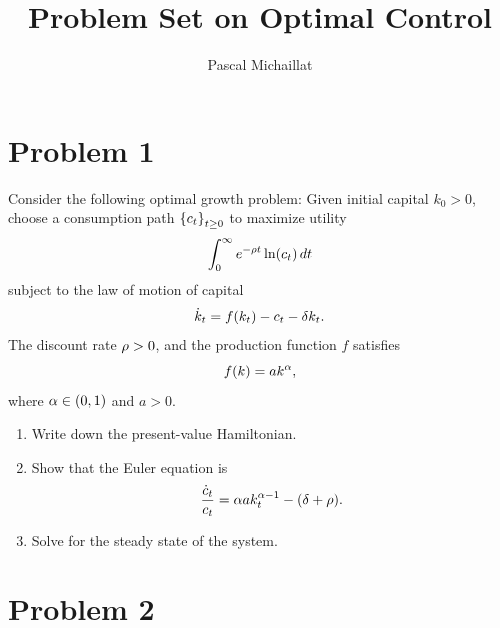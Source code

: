 \documentclass[letterpaper, 11pt, leqno]{article}
\begin{document}
\title{Problem Set on Optimal Control}
\author{Pascal Michaillat}
\date{}
\begin{titlepage}
\maketitle
\end{titlepage}

\section*{Problem 1}

Consider the following optimal growth problem: Given initial capital $k_{0}>0$, choose a consumption path $\left\lbrace c_{t} \right\rbrace_{t\ge 0}$ to maximize utility
\begin{equation*}
\int_{0}^{\infty}e^{-\r t} \ln{c_{t}}\,dt 
\end{equation*}
subject to the law of motion of capital
\begin{equation*}
\dot{k}_{t} =f(k_{t}) -c_{t}-\delta k_{t}.
\end{equation*}
The discount rate $\rho>0$, and the production function $f$ satisfies
\begin{equation*}
f(k) =a k^{\alpha},
\end{equation*}
 where $\alpha \in (0,1)$ and $a>0$.
\begin{enumerate}
\item Write down the present-value Hamiltonian.
\item Show that the Euler equation is
\begin{equation*}
\frac{\dot{c}_{t}}{c_{t}} =\alpha a k_{t}^{\alpha -1} - (\delta +\rho).
\end{equation*}
\item Solve for the steady state of the system.
\end{enumerate}

\section*{Problem 2}
\end{document}
